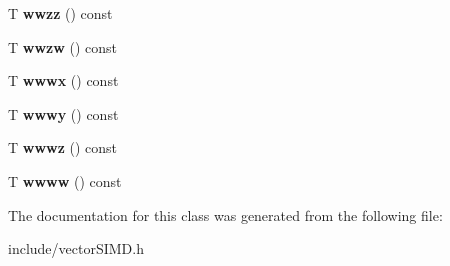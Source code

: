 \begin{DoxyCompactItemize}
\item 
T {\bfseries wwzz} () const \hypertarget{classirr_1_1core_1_1SIMD__32bitSwizzleAble_a7b54a5ff7357997881974f5ad69b833c}{}\label{classirr_1_1core_1_1SIMD__32bitSwizzleAble_a7b54a5ff7357997881974f5ad69b833c}

\item 
T {\bfseries wwzw} () const \hypertarget{classirr_1_1core_1_1SIMD__32bitSwizzleAble_a1fa834444a3db1ae7c88b4bda2990135}{}\label{classirr_1_1core_1_1SIMD__32bitSwizzleAble_a1fa834444a3db1ae7c88b4bda2990135}

\item 
T {\bfseries wwwx} () const \hypertarget{classirr_1_1core_1_1SIMD__32bitSwizzleAble_a1d788ca45fae5aa05d76c7d0549099ca}{}\label{classirr_1_1core_1_1SIMD__32bitSwizzleAble_a1d788ca45fae5aa05d76c7d0549099ca}

\item 
T {\bfseries wwwy} () const \hypertarget{classirr_1_1core_1_1SIMD__32bitSwizzleAble_a3adc52a63a2d42ef69a4e940a4fea158}{}\label{classirr_1_1core_1_1SIMD__32bitSwizzleAble_a3adc52a63a2d42ef69a4e940a4fea158}

\item 
T {\bfseries wwwz} () const \hypertarget{classirr_1_1core_1_1SIMD__32bitSwizzleAble_af111120b4205e7b6c21c340c91d61b88}{}\label{classirr_1_1core_1_1SIMD__32bitSwizzleAble_af111120b4205e7b6c21c340c91d61b88}

\item 
T {\bfseries wwww} () const \hypertarget{classirr_1_1core_1_1SIMD__32bitSwizzleAble_a33cc80735b6c925aeae335c77aacaaaa}{}\label{classirr_1_1core_1_1SIMD__32bitSwizzleAble_a33cc80735b6c925aeae335c77aacaaaa}

\end{DoxyCompactItemize}


The documentation for this class was generated from the following file\+:\begin{DoxyCompactItemize}
\item 
include/vector\+S\+I\+M\+D.\+h\end{DoxyCompactItemize}
